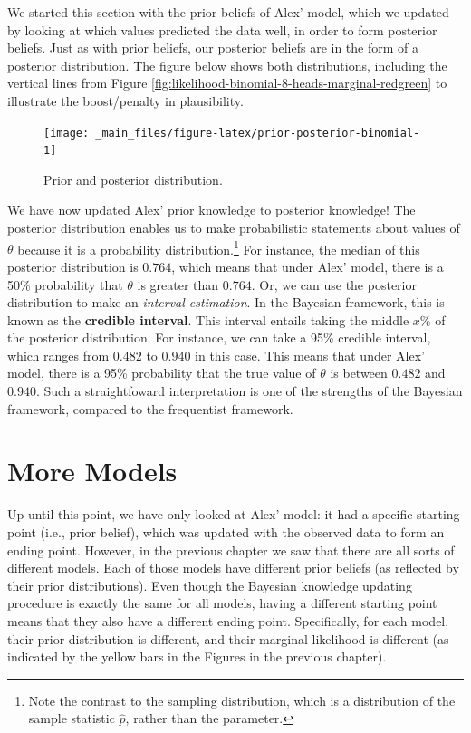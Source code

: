\documentclass[
]{book}
\begin{document}
We started this section with the prior beliefs of Alex' model, which we updated by looking at which values predicted the data well, in order to form posterior beliefs. Just as with prior beliefs, our posterior beliefs are in the form of a posterior distribution. The figure below shows both distributions, including the vertical lines from Figure \ref{fig:likelihood-binomial-8-heads-marginal-redgreen} to illustrate the boost/penalty in plausibility.

\begin{figure}

{\centering \texttt{[image: \_main\_files/figure-latex/prior-posterior-binomial-1]} 

}

\caption{Prior and posterior distribution. }\label{fig:prior-posterior-binomial}
\end{figure}

We have now updated Alex' prior knowledge to posterior knowledge! The posterior distribution enables us to make probabilistic statements about values of \(\theta\) because it is a probability distribution.\footnote{Note the contrast to the sampling distribution, which is a distribution of the sample statistic \(\hat{p}\), rather than the parameter.} For instance, the median of this posterior distribution is \(0.764\), which means that under Alex' model, there is a 50\% probability that \(\theta\) is greater than \(0.764\). Or, we can use the posterior distribution to make an \emph{interval estimation}. In the Bayesian framework, this is known as the \textbf{credible interval}. This interval entails taking the middle \(x\)\% of the posterior distribution. For instance, we can take a 95\% credible interval, which ranges from \(0.482\) to \(0.940\) in this case. This means that under Alex' model, there is a 95\% probability that the true value of \(\theta\) is between \(0.482\) and \(0.940\). Such a straightfoward interpretation is one of the strengths of the Bayesian framework, compared to the frequentist framework.

\hypertarget{more-models}{%
\section{More Models}\label{more-models}}

Up until this point, we have only looked at Alex' model: it had a specific starting point (i.e., prior belief), which was updated with the observed data to form an ending point. However, in the previous chapter we saw that there are all sorts of different models. Each of those models have different prior beliefs (as reflected by their prior distributions). Even though the Bayesian knowledge updating procedure is exactly the same for all models, having a different starting point means that they also have a different ending point. Specifically, for each model, their prior distribution is different, and their marginal likelihood is different (as indicated by the yellow bars in the Figures in the previous chapter).
\end{document}
